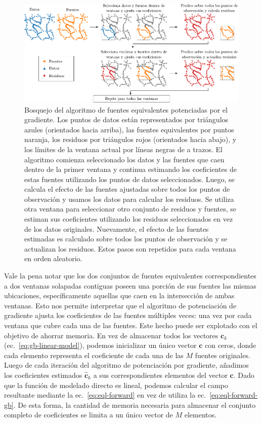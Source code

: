 \begin{figure}[tb]
    \centering
    \includegraphics[width=\linewidth]{figs/eql-gradient-boosted/gradient-boosting-schematics.pdf}
    \caption{
        Bosquejo del algoritmo de fuentes equivalentes potenciadas por el
        gradiente.
        Los puntos de datos están representados por triángulos azules
        (orientados hacia arriba), las fuentes equivalentes por puntos naranja,
        los residuos por triángulos rojos (orientados hacia abajo), y los
        límites de la ventana actual por líneas negras de a trazos.
        El algoritmo comienza seleccionado los datos y las fuentes que caen
        dentro de la primer ventana y continua estimando los coeficientes de
        estas fuentes utilizando los puntos de datos seleccionados.
        Luego, se calcula el efecto de las fuentes ajustadas sobre todos los
        puntos de observación y usamos los datos para calcular los residuos.
        Se utiliza otra ventana para seleccionar otro conjunto de residuos
        y fuentes, se estiman sus coeficientes utilizando los residuos
        seleccionados en vez de los datos originales.
        Nuevamente, el efecto de las fuentes estimadas es calculado sobre todos
        los puntos de observación y se actualizan los residuos.
        Estos pasos son repetidos para cada ventana en orden aleatorio.
    }
    \label{fig:gradient-boosting-schematics}
\end{figure}

Vale la pena notar que los dos conjuntos de fuentes equivalentes
correspondientes a dos ventanas solapadas contiguas poseen una porción de sus
fuentes las mismas ubicaciones, específicamente aquellas que caen en la
intersección de ambas ventanas.
Esto nos permite interpretar que el algoritmo de potenciación de gradiente
ajusta los coeficientes de las fuentes múltiples veces: una vez por cada
ventana que cubre cada una de las fuentes.
Este hecho puede ser explotado con el objetivo de ahorrar memoria.
En vez de almacenar todos los vectores $\mathbf{c}_k$
(ec.~\ref{eq:gb-linear-model}), podemos inicializar un único vector
$\mathbf{c}$ con ceros, donde cada elemento representa el coeficiente de cada
una de las $M$ fuentes originales.
Luego de cada iteración del algoritmo de potenciación por gradiente, añadimos
los coeficientes estimados $\hat{\mathbf{c}}_k$ a sus correspondientes
elementos del vector
$\mathbf{c}$.
Dado que la función de modelado directo es lineal, podemos calcular el campo
resultante mediante la ec.~\ref{eq:eql-forward} en vez de utiliza la
ec.~\ref{eq:eql-forward-gb}.
De esta forma, la cantidad de memoria necesaria para almacenar el conjunto
completo de coeficientes se limita a un único vector de $M$ elementos.

